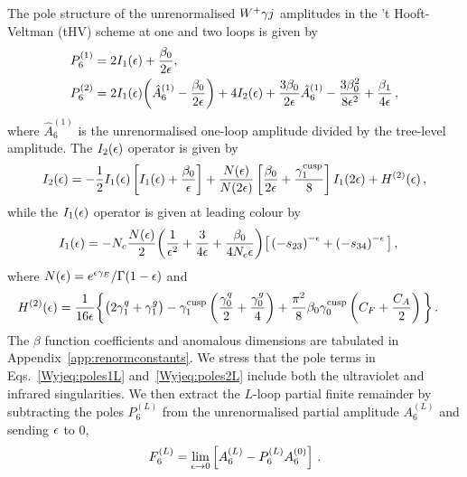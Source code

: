 \documentclass[main.tex]{subfiles}
\begin{document}
The pole structure of the unrenormalised $W^+\gamma j$ amplitudes in the 't Hooft-Veltman (tHV) scheme at one and two loops is given by~\cite{Catani:1998bh,Becher:2009qa,Becher:2009cu,Gardi:2009qi}
\begin{align}
P_6^{(1)} & = 2 I_1(\epsilon) + \frac{\beta_0}{2\epsilon},
\label{Wyjeq:poles1L} \\
P_6^{(2)} & =   2 I_1(\epsilon) \bigg( \hat{A}^{(1)}_6 - \frac{\beta_0}{2\epsilon} \bigg) + 4 I_2(\epsilon)
                +  \frac{3\beta_0}{2\epsilon}  \hat{A}^{(1)}_6  - \frac{3\beta_0^2}{8\epsilon^2} + \frac{\beta_1}{4\epsilon}  \,,
\label{Wyjeq:poles2L}
\end{align}
where $\hat{A}^{(1)}_6$ is the unrenormalised one-loop amplitude divided by the tree-level amplitude. 
The $I_2(\epsilon)$ operator is given by
\begin{equation}
I_2(\epsilon) =   - \frac{1}{2}I_1(\epsilon) \left[ I_1(\epsilon)
              + \frac{\beta_0}{\epsilon} \right]
              + \frac{N(\epsilon)}{N(2\epsilon)} \left[ \frac{\beta_0}{2\epsilon}
                        + \frac{\gamma_{1}^{{\mathrm{cusp}}}}{8} \right] I_1(2\epsilon)
              + H^{(2)}(\epsilon) \,,
\end{equation}
while the $I_1(\epsilon)$ operator is given at leading colour by
\begin{align}
I_1(\epsilon) &= -N_c \frac{N(\epsilon)}{2} \bigg( \frac{1}{\epsilon^2} + \frac{3}{4\epsilon} + \frac{\beta_0}{4 N_c \epsilon} \bigg) \big[ \left(-s_{23}\right)^{-\epsilon} + \left(-s_{34}\right)^{-\epsilon} \big] \,,
\label{Wyjeq:I1}
\end{align}
where $N(\epsilon) = {e^{\epsilon \gamma_E}}/{\Gamma(1-\epsilon)}$ and
\begin{align}
H^{(2)}(\epsilon) &= \frac{1}{16\epsilon} \bigg\lbrace \big(2\gamma_1^q+\gamma_1^g\big)
                                                - \gamma_1^{\mathrm{cusp}} \left(\frac{\gamma_0^q}{2}+\frac{\gamma_0^g}{4}\right)
                                                + \frac{\pi^2}{8} \beta_0 \gamma_0^{\mathrm{cusp}} \left(C_F+\frac{C_A}{2}\right) \bigg\rbrace \,.
\end{align}
The $\beta$ function coefficients and anomalous dimensions are tabulated in Appendix~\ref{app:renormconstants}. We stress that the pole terms in Eqs.~\eqref{Wyjeq:poles1L} and~\eqref{Wyjeq:poles2L} include both the ultraviolet and infrared singularities.
We then extract the $L$-loop partial finite remainder by subtracting the poles $P_6^{(L)}$ from the unrenormalised partial amplitude $A_6^{(L)}$ and sending $\epsilon$ to $0$,
\begin{equation}
F_6^{(L)} = \lim_{\epsilon \to 0} \left[ A_6^{(L)} - P_6^{(L)} A_6^{(0)} \right]\,.
\label{Wyjeq:finiteremainder}
\end{equation}
\end{document}
